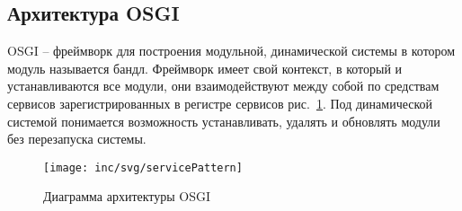 \subsection{Архитектура OSGI}
OSGI – фреймворк для построения модульной, динамической системы в котором модуль называется бандл. Фреймворк имеет свой контекст, в который и устанавливаются все модули, они взаимодействуют между собой по средствам сервисов зарегистрированных в регистре сервисов рис.~\ref{fig:servicePattern}. Под динамической системой понимается возможность устанавливать, удалять и обновлять модули без перезапуска системы.

\begin{figure}[h]
  \centering
  \texttt{[image: inc/svg/servicePattern]}
  \caption{Диаграмма архитектуры OSGI}
  \label{fig:servicePattern}
\end{figure}

